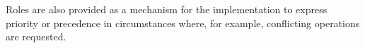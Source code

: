 \documentclass[12pt]{report} %
\begin{document}

%

Roles are also provided as a mechanism for the implementation to express priority or precedence in circumstances where, for example, conflicting operations are requested. 
\end{document}
